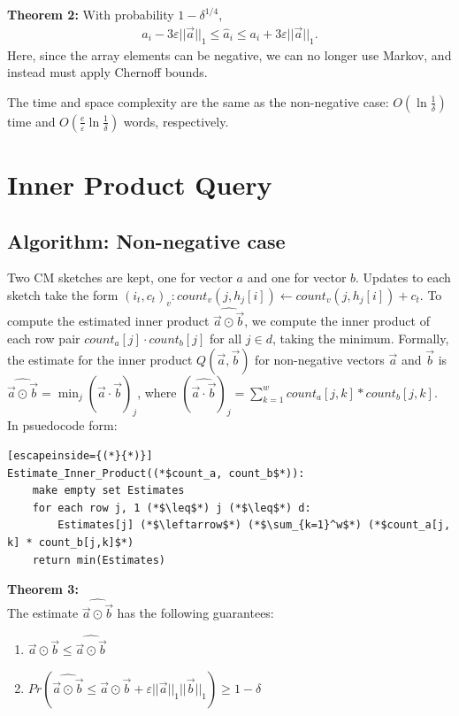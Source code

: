 \documentclass[11pt]{article}
\begin{document}
\textbf{Theorem 2:} With probability $1 - \delta^{1/4}$,
\begin{align}
    a_i - 3\varepsilon||\vec{a}||_1 \leq \hat{a}_i \leq a_i + 3\varepsilon||\vec{a}||_1. 
\end{align}
Here, since the array elements can be negative, we can no longer use Markov, and instead must apply Chernoff
bounds. 

The time and space complexity are the same as the non-negative case: $O(\ln
\frac{1}{\delta})$ time and $O(\frac{e}{\varepsilon}\ln \frac{1}{\delta})$
words, respectively. {

\section{Inner Product Query}
	\subsection{Algorithm: Non-negative case}
        Two CM sketches are kept, one for vector $a$ and one for vector $b$.
        Updates to each sketch take the form $(i_t,c_t)_v: count_v(j, h_j[i]) \leftarrow
        count_v(j, h_j[i]) + c_t$. To compute the estimated inner product
        $\widehat{\vec{a} \odot \vec{b}}$, we compute the inner product of each
        row pair $count_a[j] \cdot count_b[j]$ for all $j \in d$, taking the
        minimum. Formally, the estimate for the inner product
        $\mathit{Q}(\vec{a},\vec{b})$ for non-negative vectors $\vec{a}$ and
        $\vec{b}$ is $\widehat{\vec{a} \odot \vec{b}} = \min_j(\widehat{\vec a
        \cdot \vec b})_j$, where $(\widehat{\vec a \cdot \vec b})_j =
        \sum_{k=1}^w count_a[j,k] * count_b[j,k]$. In psuedocode form:\\
        
\begin{lstlisting}[escapeinside={(*}{*)}]
Estimate_Inner_Product((*$count_a, count_b$*)): 
    make empty set Estimates 
    for each row j, 1 (*$\leq$*) j (*$\leq$*) d:
        Estimates[j] (*$\leftarrow$*) (*$\sum_{k=1}^w$*) (*$count_a[j, k] * count_b[j,k]$*)
    return min(Estimates) 
\end{lstlisting}
\textbf{Theorem 3:}\\
        The estimate $\widehat{\vec{a} \odot \vec{b}}$ has the following guarantees:
        \begin{enumerate}[label=\textnormal{(\arabic*)}]
            \item $\vec a \odot \vec b \leq \widehat{\vec a \odot \vec b}$
            \item $ Pr(\widehat{\vec a \odot \vec b} \leq \vec a \odot \vec b + \varepsilon||\vec a||_1||\vec b||_1) \geq 1-\delta$
        \end{enumerate}
}
\end{document}
